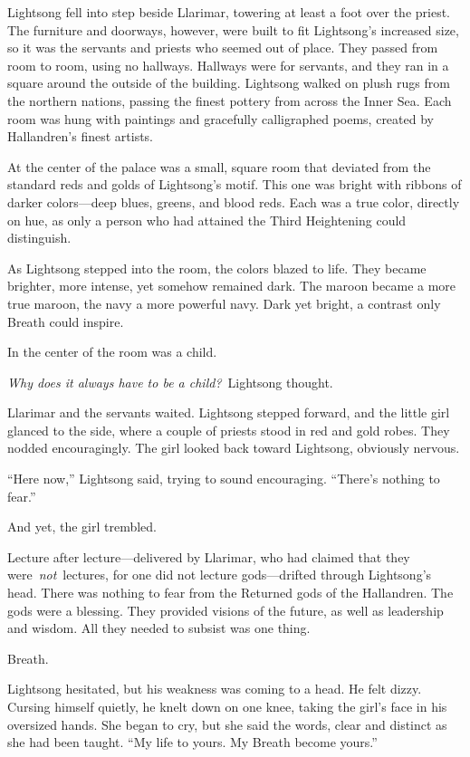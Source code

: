 Lightsong fell into step beside Llarimar, towering at least a foot over the priest. The furniture and doorways, however, were built to fit Lightsong’s increased size, so it was the servants and priests who seemed out of place. They passed from room to room, using no hallways. Hallways were for servants, and they ran in a square around the outside of the building. Lightsong walked on plush rugs from the northern nations, passing the finest pottery from across the Inner Sea. Each room was hung with paintings and gracefully calligraphed poems, created by Hallandren’s finest artists.

At the center of the palace was a small, square room that deviated from the standard reds and golds of Lightsong’s motif. This one was bright with ribbons of darker colors—deep blues, greens, and blood reds. Each was a true color, directly on hue, as only a person who had attained the Third Heightening could distinguish.

As Lightsong stepped into the room, the colors blazed to life. They became brighter, more intense, yet somehow remained dark. The maroon became a more true maroon, the navy a more powerful navy. Dark yet bright, a contrast only Breath could inspire.

In the center of the room was a child.

\textit{Why does it always have to be a child?}~Lightsong thought.

Llarimar and the servants waited. Lightsong stepped forward, and the little girl glanced to the side, where a couple of priests stood in red and gold robes. They nodded encouragingly. The girl looked back toward Lightsong, obviously nervous.

“Here now,” Lightsong said, trying to sound encouraging. “There’s nothing to fear.”

And yet, the girl trembled.

Lecture after lecture—delivered by Llarimar, who had claimed that they were~\textit{not}~lectures, for one did not lecture gods—drifted through Lightsong’s head. There was nothing to fear from the Returned gods of the Hallandren. The gods were a blessing. They provided visions of the future, as well as leadership and wisdom. All they needed to subsist was one thing.

Breath.

Lightsong hesitated, but his weakness was coming to a head. He felt dizzy. Cursing himself quietly, he knelt down on one knee, taking the girl’s face in his oversized hands. She began to cry, but she said the words, clear and distinct as she had been taught. “My life to yours. My Breath become yours.”

